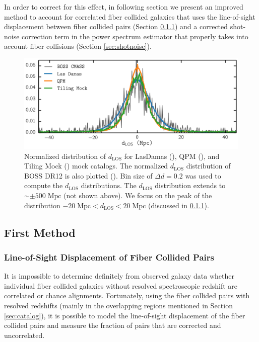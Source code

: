 \documentclass{emulateapj}
\begin{document}
In order to correct for this effect, in following section we present an improved method to account for correlated fiber collided galaxies that uses the line-of-sight displacement between fiber collided pairs (Section \ref{sec:dlos}) and a corrected shot-noise correction term in the power spectrum estimator that properly takes into account fiber collisions (Section \ref{sec:shotnoise}). 

\begin{figure}
\begin{center}
\includegraphics[scale=0.575]{fcpaper_dlos_dist.png}
\caption{Normalized distribution of $d_{\mathrm{LOS}}$ for LasDamas (\ldgcolor), QPM (\qpmcolor), and Tiling Mock (\tmcolor) mock catalogs. The normalized $d_{\mathrm{LOS}}$ distribution of BOSS DR12 is also plotted (\cmasscolor). Bin size of $\Delta d = 0.2$ was used to compute the $d_{\mathrm{LOS}}$ distributions. The $d_\mathrm{LOS}$ distribution extends to $\sim \pm 500 \; \mathrm{Mpc}$ (not shown above). We focus on the peak of the distribution $-20 \; \mathrm{Mpc} < d_\mathrm{LOS} < 20 \;\mathrm{Mpc}$ (discussed in \ref{sec:dlos}).} \label{fig:d_los}
\end{center}
\end{figure}
\subsection{First Method} \label{sec:dlospeak}
\subsubsection{Line-of-Sight Displacement of Fiber Collided Pairs} \label{sec:dlos}
It is impossible to determine definitely from observed galaxy data whether individual fiber collided galaxies without resolved spectroscopic redshift are correlated or chance alignments. Fortunately, using the fiber collided pairs with resolved redshifts (mainly in the overlapping regions mentioned in Section \ref{sec:catalog}), it is possible to model the line-of-sight displacement of the fiber collided pairs and measure the fraction of pairs that are corrected and uncorrelated. 
\end{document}
